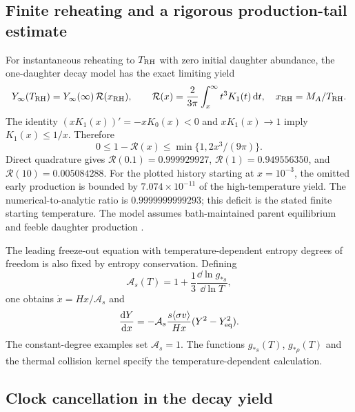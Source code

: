 \subsection{Finite reheating and a rigorous production-tail estimate}\label{sec:finite-reheating}
For instantaneous reheating to $T_{\rm RH}$ with zero initial daughter abundance, the one-daughter decay model has the exact limiting yield
\begin{equation}\label{eq:finite-reheating}
Y_\infty(T_{\rm RH})=Y_\infty(\infty)\,
\mathcal R(x_{\rm RH}),\qquad
\mathcal R(x)=\frac{2}{3\pi}\int_x^\infty t^3K_1(t)\,\mathrm{d} t,
\quad x_{\rm RH}=M_A/T_{\rm RH}.
\end{equation}
The identity $(xK_1(x))'=-xK_0(x)<0$ and $xK_1(x)\to1$ imply $K_1(x)\leq1/x$. Therefore
\begin{equation}\label{eq:reheating-bound}
0\leq1-\mathcal R(x)\leq\min\{1,2x^3/(9\pi)\}.
\end{equation}
Direct quadrature gives $\mathcal R(0.1)=0.999929927$, $\mathcal R(1)=0.949556350$, and $\mathcal R(10)=0.005084288$. For the plotted history starting at $x=10^{-3}$, the omitted early production is bounded by $7.074\times10^{-11}$ of the high-temperature yield. The numerical-to-analytic ratio is $0.9999999999293$; this deficit is the stated finite starting temperature. The model assumes bath-maintained parent equilibrium and feeble daughter production \cite{Hall10}.

The leading freeze-out equation with temperature-dependent entropy degrees of freedom is also fixed by entropy conservation. Defining
\[
\mathcal A_s(T)=1+\frac13\frac{\dd\ln g_{*s}}{\dd\ln T},
\]
one obtains $\dot x=Hx/\mathcal A_s$ and
\[
\frac{\mathrm{d} Y}{\mathrm{d} x}=-\mathcal A_s\frac{s\langle\sigma v\rangle}{Hx}(Y^2-Y_{\rm eq}^2).
\]
The constant-degree examples set $\mathcal A_s=1$. The functions $g_{*s}(T)$, $g_{*\rho}(T)$ and the thermal collision kernel specify the temperature-dependent calculation.
\subsection{Clock cancellation in the decay yield}

